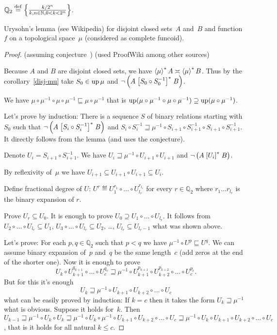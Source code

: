 $\mathbb{Q}_2 \overset{\mathrm{def}}{=} \left\{ \frac{ k/2^n }{k, n \in \mathbb{N}, 0 < k < 2^n }\right\}$.

\begin{thm}
Urysohn's lemma (see Wikipedia) for disjoint closed sets~$A$ and~$B$ and function~$f$ on a topological space~$\mu$
(considered as complete funcoid).
\end{thm}

\begin{proof}
(assuming conjecture~) (used ProofWiki among other sources)

Because $A$ and $B$ are disjoint closed sets, we
have $\left\langle \mu\right\rangle ^{\ast} A \asymp \left\langle \mu\right\rangle ^{\ast} B$. Thus by the corollary~\ref{disj-mu} take $S_0 \in \operatorname{up}
\mu$ and $\neg \left( A \mathrel{\left[S_0 \circ S_0^{- 1}\right]^{\ast}} B
\right)$.

We have $\mu \circ \mu^{- 1} \circ \mu \circ \mu^{- 1}
\sqsubseteq \mu \circ \mu^{- 1}$ that is $\operatorname{up} (\mu
\circ \mu^{- 1} \circ \mu \circ \mu^{- 1}) \supseteq
\operatorname{up} (\mu \circ \mu^{- 1})$.

Let's prove by induction: There is a sequence $S$ of binary relations starting
with $S_0$ such that $\neg \left( A \mathrel{\left[S_i \circ S_i^{- 1}\right]^{\ast}} B
\right)$ and $S_i \circ S_i^{- 1} \sqsupseteq \mu^{-1} \circ S_{i + 1} \circ S_{i + 1}^{- 1}
\circ S_{i + 1} \circ S_{i + 1}^{- 1}$. It directly follows from the lemma
(and uses the conjecture).

Denote $U_i = S_{i + 1} \circ S_{i + 1}^{- 1}$. We have $U_i \sqsupseteq \mu^{-1} \circ U_{i +
1} \circ U_{i + 1}$ and $\neg \left( A \mathrel{\left[U_i\right]^{\ast}} B \right)$.

By reflexivity of~$\mu$ we have $U_{i+1} \subseteq U_{i+1}\circ U_{i+1} \subseteq U_i$.

Define fractional degree of $U$: $U^r \eqdef U_1^{r_1} \circ
\ldots \circ U_{l_r}^{r_{l_r}}$ for every $r \in \mathbb{Q}_2$ where $r_1
\ldots r_{l_r}$ is the binary expansion of $r$.

Prove $U_r\subseteq U_0$. It is enough to prove
$U_0 \supseteq U_1 \circ \ldots \circ U_{l_r}$. It follows from $U_2 \circ
\ldots \circ U_{l_r} \subseteq U_1$, $U_3 \circ \ldots \circ U_{l_r} \subseteq
U_2$, \dots, $U_{l_r} \subseteq U_{l_r - 1}$ what was shown above.

Let's prove: For each $p,q\in\mathbb{Q}_2$ such that $p<q$ we have $\mu^{-1}\circ U^p\sqsubseteq U^q$.
We can assume binary expansion of~$p$ and~$q$ be the same length~$c$ (add zeros at the end of the shorter one).
Now it is enough to prove
\[ U_k\circ U_{k+1}^{q_{k+1}}\circ\dots\circ U_c^{q_c}\sqsupseteq\mu^{-1}\circ U_{k+1}^{p_{k+1}}\circ U_{k+2}^{p_{k+2}}\circ\dots\circ U_c^{p_c}. \]
But for this it's enough
\[ U_k\sqsupseteq\mu^{-1}\circ U_{k+1}\circ U_{k+2}\circ\dots\circ U_c \]
what can be easily proved by induction:
If $k=c$ then it takes the form $U_k\sqsupseteq\mu^{-1}$
what is obvious.
Suppose it holds for~$k$. Then $U_{k-1}\sqsupseteq\mu^{-1}\circ U_k\circ U_k\sqsupseteq
\mu^{-1}\circ U_k\circ \mu^{-1}\circ U_{k+1}\circ U_{k+2}\circ\dots\circ U_c\sqsupseteq
\mu^{-1}\circ U_k\circ U_{k+1}\circ U_{k+2}\circ\dots\circ U_c$, that is it holds
for all natural $k\leq c$.


\end{proof}
